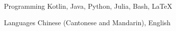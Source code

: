 

\begin{cvskills}

  \cvskill
    {Programming} %
    {Kotlin, Java, Python, Julia, Bash, LaTeX} %

  \cvskill
    {Languages} %
    {Chinese (Cantonese and Mandarin), English} %

\end{cvskills}
